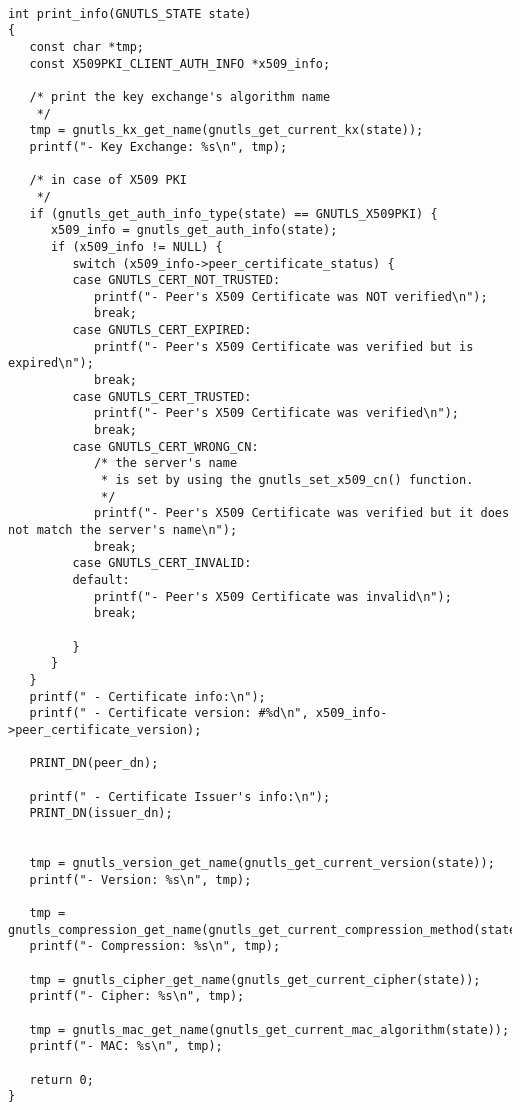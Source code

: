 \begin{verbatim}

int print_info(GNUTLS_STATE state)
{
   const char *tmp;
   const X509PKI_CLIENT_AUTH_INFO *x509_info;

   /* print the key exchange's algorithm name
    */
   tmp = gnutls_kx_get_name(gnutls_get_current_kx(state));
   printf("- Key Exchange: %s\n", tmp);

   /* in case of X509 PKI
    */
   if (gnutls_get_auth_info_type(state) == GNUTLS_X509PKI) {
      x509_info = gnutls_get_auth_info(state);
      if (x509_info != NULL) {
         switch (x509_info->peer_certificate_status) {
         case GNUTLS_CERT_NOT_TRUSTED:
            printf("- Peer's X509 Certificate was NOT verified\n");
            break;
         case GNUTLS_CERT_EXPIRED:
            printf("- Peer's X509 Certificate was verified but is expired\n");
            break;
         case GNUTLS_CERT_TRUSTED:
            printf("- Peer's X509 Certificate was verified\n");
            break;
         case GNUTLS_CERT_WRONG_CN:
            /* the server's name
             * is set by using the gnutls_set_x509_cn() function.
             */
            printf("- Peer's X509 Certificate was verified but it does not match the server's name\n");
            break;
         case GNUTLS_CERT_INVALID:
         default:
            printf("- Peer's X509 Certificate was invalid\n");
            break;

         }
      }
   }
   printf(" - Certificate info:\n");
   printf(" - Certificate version: #%d\n", x509_info->peer_certificate_version);

   PRINT_DN(peer_dn);

   printf(" - Certificate Issuer's info:\n");
   PRINT_DN(issuer_dn);


   tmp = gnutls_version_get_name(gnutls_get_current_version(state));
   printf("- Version: %s\n", tmp);

   tmp = gnutls_compression_get_name(gnutls_get_current_compression_method(state));
   printf("- Compression: %s\n", tmp);

   tmp = gnutls_cipher_get_name(gnutls_get_current_cipher(state));
   printf("- Cipher: %s\n", tmp);

   tmp = gnutls_mac_get_name(gnutls_get_current_mac_algorithm(state));
   printf("- MAC: %s\n", tmp);

   return 0;
}

\end{verbatim}
